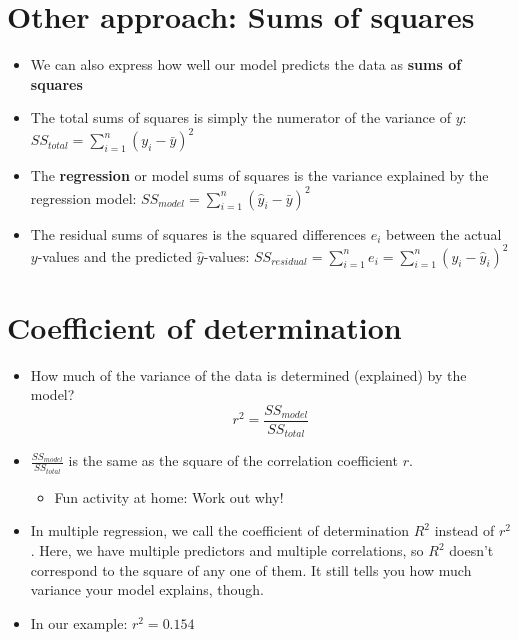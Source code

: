 \documentclass[]{article}
\providecommand{\tightlist}{%
  \setlength{\itemsep}{0pt}\setlength{\parskip}{0pt}}
\begin{document}
\section{Other approach: Sums of
squares}\label{other-approach-sums-of-squares}

\begin{itemize}
\tightlist
\item
  We can also express how well our model predicts the data as
  \textbf{sums of squares}
\item
  The total sums of squares is simply the numerator of the variance of
  \(y\): \({SS}_{total} = \sum\limits_{i=1}^{n}(y_i - \bar{y})^2\)
\item
  The \textbf{regression} or model sums of squares is the variance
  explained by the regression model:
  \({SS}_{model} = \sum\limits_{i=1}^{n}(\hat{y}_i - \bar{y})^2\)
\item
  The residual sums of squares is the squared differences \(e_i\)
  between the actual \(y\)-values and the predicted \(\hat{y}\)-values:
  \({SS}_{residual} = \sum\limits_{i=1}^{n}e_i = \sum\limits_{i=1}^{n}(y_i - \hat{y}_i)^2\)
\end{itemize}

\section{Coefficient of
determination}\label{coefficient-of-determination}

\begin{itemize}
\tightlist
\item
  How much of the variance of the data is determined (explained) by the
  model? \[r^2 = \frac{{SS}_{model}}{{SS}_{total}}\]
\item
  \(\frac{{SS}_{model}}{{SS}_{total}}\) is the same as the square of the
  correlation coefficient \(r\).

  \begin{itemize}
  \tightlist
  \item
    Fun activity at home: Work out why!
  \end{itemize}
\item
  In multiple regression, we call the coefficient of determination
  \(R^2\) instead of \(r^2\). Here, we have multiple predictors and
  multiple correlations, so \(R^2\) doesn't correspond to the square of
  any one of them. It still tells you how much variance your model
  explains, though.
\item
  In our example: \(r^2 = 0.154\)
\end{itemize}
\end{document}
